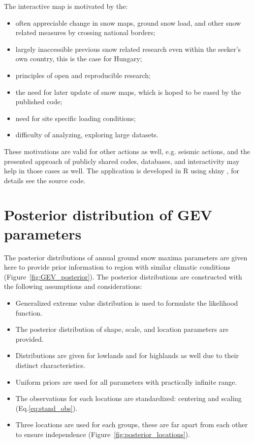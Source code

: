 \medskip
\noindent
The interactive map is motivated by the:
\begin{itemize}
	\item often appreciable change in snow maps, ground snow load, and other snow related measures by crossing national borders;
	\item largely inaccessible previous snow related research even within the seeker's own country, this is the case for Hungary;
	\item principles of open and reproducible research;
	\item the need for later update of snow maps, which is hoped to be eased by the published code;
	\item need for site specific loading conditions;
	\item difficulty of analyzing, exploring large datasets.
\end{itemize}

These motivations are valid for other actions as well, e.g. seismic actions, and the presented approach of publicly shared codes, databases, and interactivity may help in those cases as well. The application is developed in R \citep{R2015} using shiny \citep{shiny2015}, for details see the source code.


\section{Posterior distribution of GEV parameters}
\label{sec:GEV_posterior}

The posterior distributions of annual ground snow maxima parameters are given here to provide prior information to region with similar climatic conditions (Figure~\ref{fig:GEV_posterior}). The posterior distributions are constructed with the following assumptions and considerations:
\begin{itemize}
	\item Generalized extreme value distribution is used to formulate the likelihood function.
	\item The posterior distribution of shape, scale, and location parameters are provided.
	\item Distributions are given for lowlands and for highlands as well due to their distinct characteristics.
	\item Uniform priors are used for all parameters with practically infinite range.
	\item The observations for each locations are standardized: centering and scaling (Eq.\ref{eq:stand_obs}).
	\item Three locations are used for each groups, these are far apart from each other to ensure independence (Figure~\ref{fig:posterior_locations}). 
\end{itemize}

